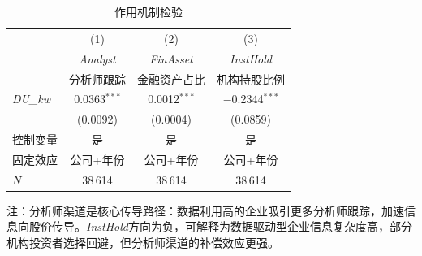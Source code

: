 \documentclass[11pt,a4paper]{article}
\begin{document}
\FloatBarrier

\begin{table}[htbp]
\centering
\caption{作用机制检验}
\label{tab:mechanism}
\small
\begin{tabular}{l*{3}{c}}
\toprule
 & (1) & (2) & (3) \\
 & \textit{Analyst} & \textit{FinAsset} & \textit{InstHold} \\
 & 分析师跟踪 & 金融资产占比 & 机构持股比例 \\
\midrule
\textit{DU\_kw}
 & 0.0363$^{***}$ & 0.0012$^{***}$ & $-$0.2344$^{***}$ \\
 & (0.0092) & (0.0004) & (0.0859) \\[6pt]
\midrule
控制变量 & 是 & 是 & 是 \\
固定效应 & 公司+年份 & 公司+年份 & 公司+年份 \\
$N$ & 38\,614 & 38\,614 & 38\,614 \\
\bottomrule
\end{tabular}

\vspace{4pt}
{\footnotesize 注：分析师渠道是核心传导路径：数据利用高的企业吸引更多分析师跟踪，加速信息向股价传导。\textit{InstHold}方向为负，可解释为数据驱动型企业信息复杂度高，部分机构投资者选择回避，但分析师渠道的补偿效应更强。}
\end{table}


\FloatBarrier
\end{document}
